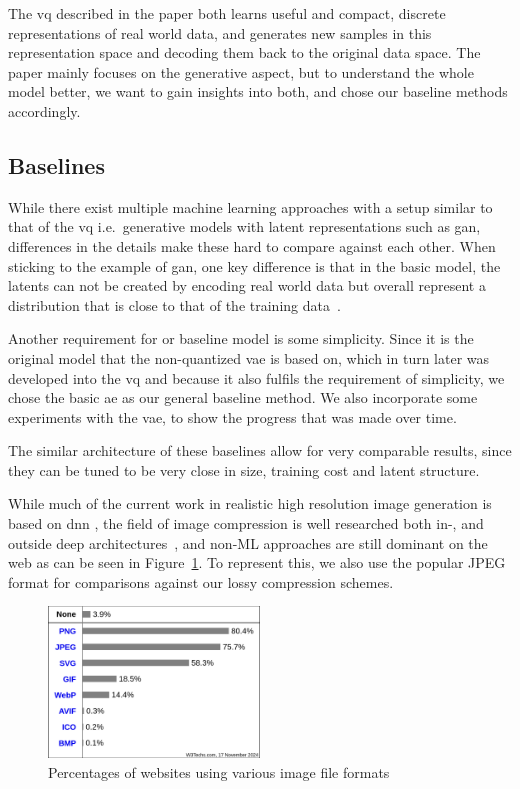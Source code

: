 The \ac{vq} described in the paper both learns useful and compact, discrete representations of real world data,
and generates new samples in this representation space and decoding them back to the original data space.
The paper mainly focuses on the generative aspect, but to understand the whole model better, we want to gain insights
into both, and chose our baseline methods accordingly.

\subsection{Baselines}\label{subsec:baselines}
While there exist multiple machine learning approaches with a setup similar to that of the \ac{vq}
i.e.\ generative models with latent representations such as \ac{gan}, differences in the details make these hard to
compare against each other.
When sticking to the example of \ac{gan}, one key difference is that in the basic model, the latents can not be created
by encoding real world data but overall represent a distribution that is close to that of the training data~\cite{gan}.

Another requirement for or baseline model is some simplicity.
Since it is the original model that the non-quantized \ac{vae} is based on, which in turn later was developed into the
\ac{vq} and because it also fulfils the requirement of simplicity, we chose the basic \ac{ae} as our general baseline
method.
We also incorporate some experiments with the \ac{vae}, to show the progress that was made over time.

The similar architecture of these baselines allow for very comparable results, since they can be tuned to be very
close in size, training cost and latent structure.

While much of the current work in realistic high resolution image generation is based on \ac{dnn} \cite{addsources},
the field of image compression is well researched both in-, and outside deep architectures~\cite{compression},
and non-ML approaches are still dominant on the web as can be seen in Figure~\ref{fig:file_formats}.
To represent this, we also use the popular JPEG format for comparisons against our lossy compression schemes.

\begin{figure}[h]
    \centering
    \includegraphics[width=0.5\textwidth]{images/formats}
    \caption{Percentages of websites using various image file formats~\cite{img_file_format}}
    \label{fig:file_formats}
\end{figure}


